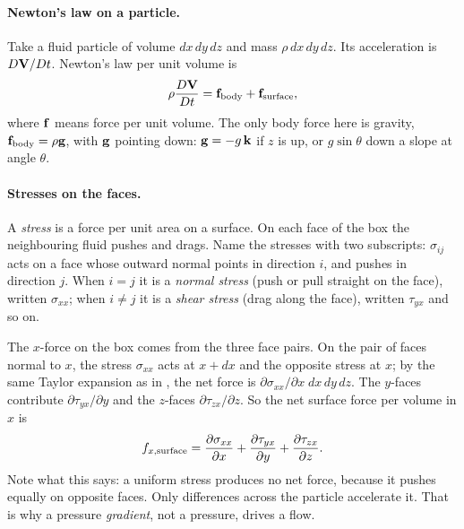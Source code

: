 \paragraph{Newton's law on a particle.} Take a fluid particle of volume $dx\,dy\,dz$ and mass $\rho\,dx\,dy\,dz$. Its acceleration is $D\mathbf{V}/Dt$. Newton's law per unit volume is
\[
\rho\frac{D\mathbf{V}}{Dt} = \mathbf{f}_{\text{body}} + \mathbf{f}_{\text{surface}},
\]
where $\mathbf{f}$ means force per unit volume. The only body force here is gravity, $\mathbf{f}_{\text{body}} = \rho\mathbf{g}$, with $\mathbf{g}$ pointing down: $\mathbf{g} = -g\,\mathbf{k}$ if $z$ is up, or $g\sin\theta$ down a slope at angle $\theta$.

\paragraph{Stresses on the faces.} A \emph{stress} is a force per unit area on a surface. On each face of the box the neighbouring fluid pushes and drags. Name the stresses with two subscripts: $\sigma_{ij}$ acts on a face whose outward normal points in direction $i$, and pushes in direction $j$. When $i = j$ it is a \emph{normal stress} (push or pull straight on the face), written $\sigma_{xx}$; when $i \ne j$ it is a \emph{shear stress} (drag along the face), written $\tau_{yx}$ and so on.

The $x$-force on the box comes from the three face pairs. On the pair of faces normal to $x$, the stress $\sigma_{xx}$ acts at $x + dx$ and the opposite stress at $x$; by the same Taylor expansion as in , the net force is $\partial\sigma_{xx}/\partial x\;dx\,dy\,dz$. The $y$-faces contribute $\partial\tau_{yx}/\partial y$ and the $z$-faces $\partial\tau_{zx}/\partial z$. So the net surface force per volume in $x$ is
\[
f_{x,\text{surface}} = \frac{\partial \sigma_{xx}}{\partial x} + \frac{\partial \tau_{yx}}{\partial y} + \frac{\partial \tau_{zx}}{\partial z} .
\]
Note what this says: a uniform stress produces no net force, because it pushes equally on opposite faces. Only differences across the particle accelerate it. That is why a pressure \emph{gradient}, not a pressure, drives a flow.

